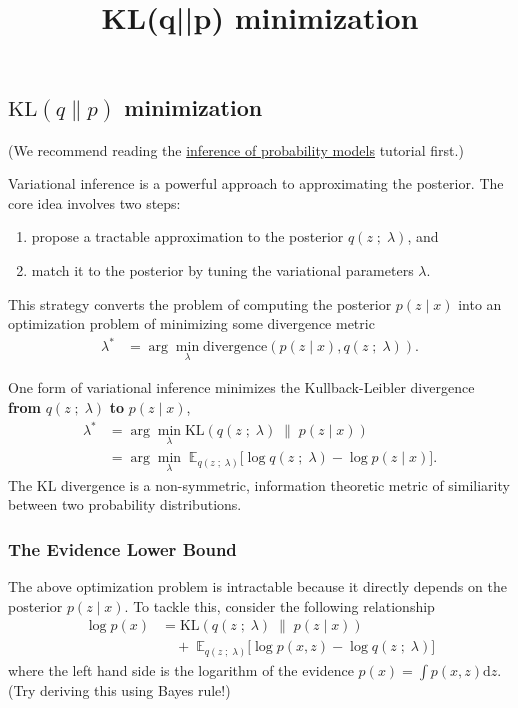 \title{KL(q||p) minimization}

\subsection{$\text{KL}(q\|p)$ minimization}

(We recommend reading the 
\href{tut_inference_probability_models.html}{inference of probability models}
tutorial first.)

Variational inference is a powerful approach to approximating the posterior. The
core idea involves two steps:
\begin{enumerate}
   \item propose a tractable approximation to the posterior $q(z\;;\;\lambda)$,
   and
   \item match it to the posterior by tuning the variational
   parameters $\lambda$.
 \end{enumerate} 
This strategy converts the problem of computing the posterior $p(z \mid x)$ into
an optimization problem of minimizing some divergence metric
\begin{align*}
  \lambda^* 
  &=
  \arg\min_\lambda \text{divergence}( 
  p(z \mid x)
  ,
  q(z\;;\;\lambda)
  ).
\end{align*}

One form of variational inference minimizes the Kullback-Leibler divergence 
\textbf{from} $q(z\;;\;\lambda)$ \textbf{to} $p(z \mid x)$,
\begin{align*}
  \lambda^* 
  &=
  \arg\min_\lambda \text{KL}( 
  q(z\;;\;\lambda)
  \;\|\;
  p(z \mid x)
  )\\
  &=
  \arg\min_\lambda\;
  \mathbb{E}_{q(z\;;\;\lambda)}
  \big[
  \log q(z\;;\;\lambda)
  -
  \log p(z \mid x)
  \big].
\end{align*}
The KL divergence is a non-symmetric, information theoretic metric of
similiarity between two probability distributions. 

\subsubsection{The Evidence Lower Bound}

The above optimization problem is intractable because it directly depends on the
posterior $p(z \mid x)$. To tackle this, consider the following relationship
\begin{align*}
  \log p(x)
  &=
  \text{KL}( 
  q(z\;;\;\lambda)
  \;\|\;
  p(z \mid x)
  )\\
  &\quad+\;
  \mathbb{E}_{q(z\;;\;\lambda)}
  \big[
  \log p(x, z)
  -
  \log q(z\;;\;\lambda)
  \big]
\end{align*}
where the left hand side is the logarithm of the evidence 
$p(x) = \int p(x,z) \text{d}z$. (Try deriving this using Bayes rule!)

